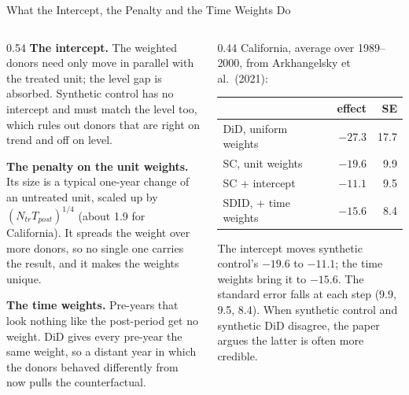 \documentclass[main.tex]{subfiles}
\begin{document}
\begin{frame}{What the Intercept, the Penalty and the Time Weights Do}
  \begin{columns}[T]
    \begin{column}{0.54\textwidth}
      \footnotesize
      \textbf{The intercept.} The weighted donors need only move in parallel
      with the treated unit; the level gap is absorbed. Synthetic control has
      no intercept and must match the level too, which rules out donors that
      are right on trend and off on level.
      \medskip

      \textbf{The penalty on the unit weights.} Its size is a typical
      one-year change of an untreated unit, scaled up by
      $(N_{tr}T_{post})^{1/4}$ (about 1.9 for California). It spreads the weight over more
      donors, so no single one carries the result, and it makes the weights
      unique.
      \medskip

      \textbf{The time weights.} Pre-years that look nothing like the
      post-period get no weight. DiD gives every pre-year the same weight, so
      a distant year in which the donors behaved differently from now pulls
      the counterfactual.
    \end{column}
    \begin{column}{0.44\textwidth}
      \footnotesize
      California, average over 1989--2000, from Arkhangelsky et al.\ (2021):

      \smallskip
      \begin{tabular}{@{}lrr@{}}
        \toprule
        & effect & SE \\
        \midrule
        DiD, uniform weights & $-27.3$ & 17.7 \\
        SC, unit weights & $-19.6$ & 9.9 \\
        SC + intercept & $-11.1$ & 9.5 \\
        SDID, + time weights & $-15.6$ & 8.4 \\
        \bottomrule
      \end{tabular}

      \smallskip
      The intercept moves synthetic control's $-19.6$ to $-11.1$; the time
      weights bring it to $-15.6$. The standard error falls at each step
      (9.9, 9.5, 8.4). When synthetic control and synthetic DiD disagree,
      the paper argues the latter is often more credible.
    \end{column}
  \end{columns}
\end{frame}
\end{document}
